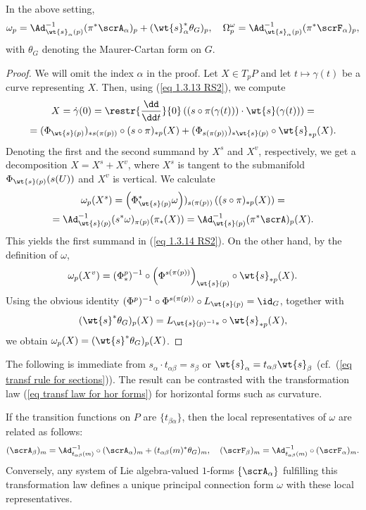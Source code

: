 \begin{prop}[{{\cite[Prop.~1.3.11]{RS2}}}]
    In the above setting, 
    \[\omega_p=\Ad_{\wt{s}_\alpha(p)}^{-1}(\pi^\ast\scrA_\alpha)_p+(\wt{s}_\alpha^\ast \theta_G)_p,\quad \Omega^\omega_p=\Ad_{\wt{s}_\alpha(p)}^{-1}(\pi^\ast \scrF_\alpha)_p, \label{eq 1.3.14 RS2}\]
    with $\theta_G$ denoting the Maurer-Cartan form on $G$.
\end{prop}
\begin{proof}
    We will omit the index $\alpha$ in the proof. Let $X\in T_pP$ and let $t\mapsto \gamma(t)$ be a curve representing $X$. Then, using (\ref{eq 1.3.13 RS2}), we compute
    \begin{multline}
        X=\dot\gamma(0)=\restr{\frac{\dd}{\dd t}}{0} \left((s\circ \pi(\gamma(t)))\cdot \wt{s}(\gamma(t))\right)=\\
        =(\Phi_{\wt{s}(p)})_{\ast s(\pi(p))}\circ (s\circ \pi)_{\ast p}(X)+(\Phi_{s(\pi(p))})_{\ast\wt{s}(p)}\circ \wt{s}_{\ast p}(X).
    \end{multline}
    Denoting the first and the second summand by $X^s$ and $X^v$, respectively, we get a decomposition $X=X^s+X^v$, where $X^s$ is tangent to the submanifold $\Phi_{\wt{s}(p)}(s(U))$ and $X^v$ is vertical. We calculate
    \begin{multline}
        \omega_p(X^s)=\left(\Phi_{\wt{s}(p)}^\ast\omega\right))_{s(\pi(p))}\left((s\circ\pi)_{\ast p}(X)\right)=\\
        =\Ad_{\wt{s}(p)}^{-1}(s^\ast \omega)_{\pi(p)}(\pi_\ast(X))=\Ad_{\wt{s}(p)}^{-1}(\pi^\ast\scrA)_p(X).
    \end{multline}
    This yields the first summand in (\ref{eq 1.3.14 RS2}). On the other hand, by the definition of $\omega$, 
    \[\omega_p(X^v)=(\Phi^p_{\ast})^{-1}\circ \left(\Phi^{s(\pi(p))}\right)_{\wt{s}(p)}\circ \wt{s}_{\ast p}(X).\]
    Using the obvious identity $(\Phi^p)^{-1}\circ \Phi^{s(\pi(p))}\circ L_{\wt{s}(p)}=\id_G$, together with
    \[(\wt{s}^\ast \theta_G)_p(X)=L_{\wt{s}(p)^{-1}\ast }\circ\wt{s}_{\ast p}(X),\]
    we obtain $\omega_p(X)=(\wt{s}^\ast\theta_G)_p(X)$.
\end{proof}
The following is immediate from $s_\alpha\cdot t_{\alpha\beta}=s_\beta$  or $\wt{s}_\alpha=t_{\alpha\beta}\wt{s}_\beta$ (cf.\ (\ref{eq transf rule for sections})). The result can be contrasted with the transformation law (\ref{eq transf law for hor forms}) for horizontal forms such as curvature.
\begin{cor}[{{\cite[Cor.~1.3.12]{RS2}}}]\label{cor 1.3.12 RS2}
    If the transition functions on $P$ are $\{t_{\beta\alpha}\}$, then the local representatives of $\omega$ are related as follows:
    \[(\scrA_\beta)_m=\Ad_{t_{\alpha\beta}(m)}^{-1}\circ (\scrA_\alpha)_m+(t_{\alpha\beta}(m)^\ast\theta_G)_m,\quad (\scrF_\beta)_m=\Ad_{t_{\alpha\beta}(m)}^{-1}\circ (\scrF_\alpha)_m.\label{eq 1.3.15 RS2}\]
    Conversely, any system of Lie algebra-valued $1$-forms $\{\scrA_\alpha\}$ fulfilling this transformation law defines a unique principal connection form $\omega$ with these local representatives.
\end{cor}

